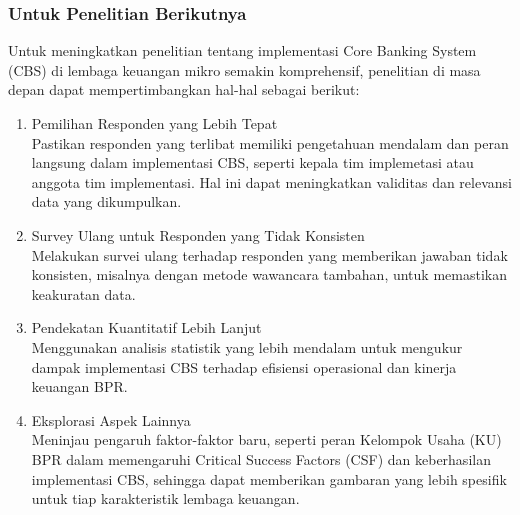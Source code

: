 \documentclass[journal,article,submit,pdftex,moreauthors]{Definitions/mdpi}
\begin{document}
\subsubsection{Untuk Penelitian Berikutnya}
Untuk meningkatkan penelitian tentang implementasi Core Banking System (CBS) di lembaga keuangan mikro semakin komprehensif, penelitian di masa depan dapat mempertimbangkan hal-hal sebagai berikut:
\begin{enumerate}
   \item Pemilihan Responden yang Lebih Tepat 
   \\Pastikan responden yang terlibat memiliki pengetahuan mendalam dan peran langsung dalam implementasi CBS, seperti kepala tim implemetasi atau anggota tim implementasi. Hal ini dapat meningkatkan validitas dan relevansi data yang dikumpulkan.
\item Survey Ulang untuk Responden yang Tidak Konsisten
\\ Melakukan survei ulang terhadap responden yang memberikan jawaban tidak konsisten, misalnya dengan metode wawancara tambahan, untuk memastikan keakuratan data.

\item Pendekatan Kuantitatif Lebih Lanjut
\\ Menggunakan analisis statistik yang lebih mendalam untuk mengukur dampak implementasi CBS terhadap efisiensi operasional dan kinerja keuangan BPR.

\item Eksplorasi Aspek Lainnya
\\ Meninjau pengaruh faktor-faktor baru, seperti peran Kelompok Usaha (KU) BPR dalam memengaruhi Critical Success Factors (CSF) dan keberhasilan implementasi CBS, sehingga dapat memberikan gambaran yang lebih spesifik untuk tiap karakteristik lembaga keuangan.

\end{enumerate}
\end{document}
